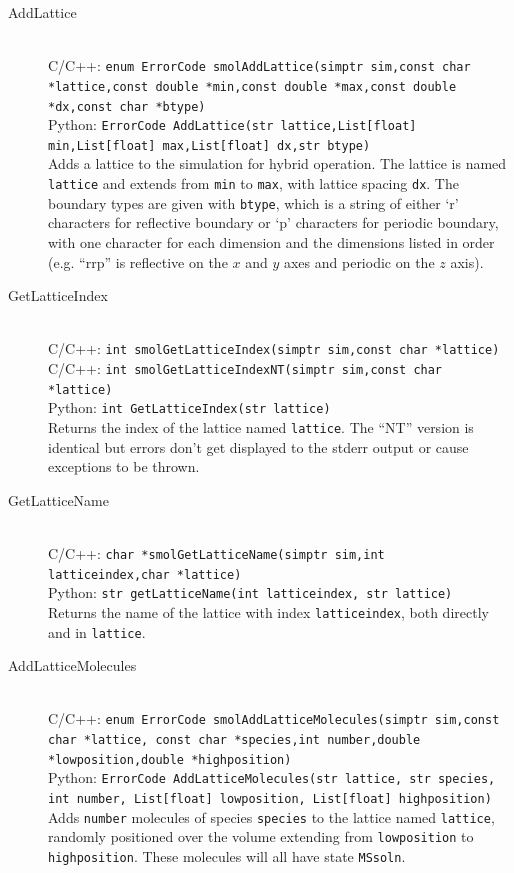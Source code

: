 \documentclass {scrbook}
\newcommand {\ttt} {\texttt}
\begin{document}
\begin{description}

\item[AddLattice]
\hfill \\
C/C++: \ttt{enum ErrorCode smolAddLattice(simptr sim,const char *lattice,const double *min,const double *max,const double *dx,const char *btype)}\\
Python: \ttt{ErrorCode AddLattice(str lattice,List[float] min,List[float] max,List[float] dx,str btype)}\\
Adds a lattice to the simulation for hybrid operation. The lattice is named \ttt{lattice} and extends from \ttt{min} to \ttt{max}, with lattice spacing \ttt{dx}. The boundary types are given with \ttt{btype}, which is a string of either `r' characters for reflective boundary or `p' characters for periodic boundary, with one character for each dimension and the dimensions listed in order (e.g. ``rrp'' is reflective on the $x$ and $y$ axes and periodic on the $z$ axis).

\item[GetLatticeIndex]
\hfill \\
C/C++: \ttt{int smolGetLatticeIndex(simptr sim,const char *lattice)}\\
C/C++: \ttt{int smolGetLatticeIndexNT(simptr sim,const char *lattice)}\\
Python: \ttt{int GetLatticeIndex(str lattice)}\\
Returns the index of the lattice named \ttt{lattice}. The ``NT'' version is identical but errors don't get displayed to the stderr output or cause exceptions to be thrown.

\item[GetLatticeName]
\hfill \\
C/C++: \ttt{char *smolGetLatticeName(simptr sim,int latticeindex,char *lattice)}\\
Python: \ttt{str getLatticeName(int latticeindex, str lattice)}\\
Returns the name of the lattice with index \ttt{latticeindex}, both directly and in \ttt{lattice}.

\item[AddLatticeMolecules]
\hfill \\
C/C++: \ttt{enum ErrorCode smolAddLatticeMolecules(simptr sim,const char *lattice, const char *species,int number,double *lowposition,double *highposition)}\\
Python: \ttt{ErrorCode AddLatticeMolecules(str lattice, str species, int number, List[float] lowposition, List[float] highposition)}\\
Adds \ttt{number} molecules of species \ttt{species} to the lattice named \ttt{lattice}, randomly positioned over the volume extending from \ttt{lowposition} to \ttt{highposition}. These molecules will all have state \ttt{MSsoln}.


\end{description}
\end{document}

